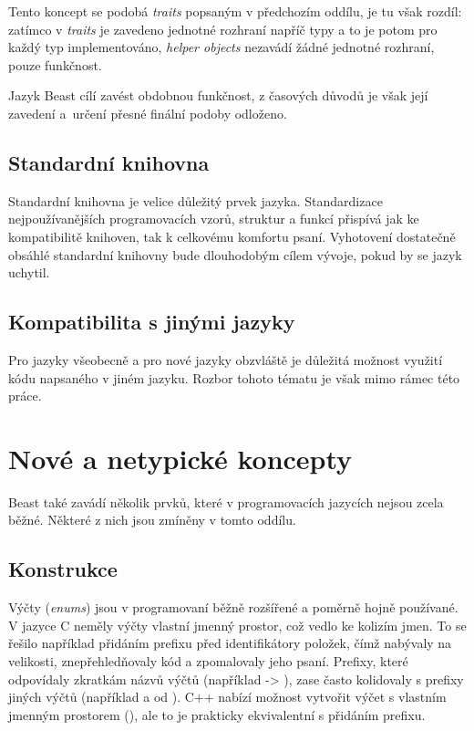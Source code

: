 Tento koncept se podobá \textit{traits} popsaným v předchozím oddílu, je tu však rozdíl: zatímco v \textit{traits} je zavedeno jednotné rozhraní napříč typy a to je potom pro každý typ implementováno, \textit{helper objects} nezavádí žádné jednotné rozhraní, pouze funkčnost.

Jazyk Beast cílí zavést obdobnou funkčnost, z časových důvodů je však její zavedení a~určení přesné finální podoby odloženo.

\subsection{Standardní knihovna}
Standardní knihovna je velice důležitý prvek jazyka. Standardizace nejpoužívanějších programovacích vzorů, struktur a funkcí přispívá jak ke kompatibilitě knihoven, tak k celkovému komfortu psaní. Vyhotovení dostatečně obsáhlé standardní knihovny bude dlouhodobým cílem vývoje, pokud by se jazyk uchytil.

\subsection{Kompatibilita s jinými jazyky}
Pro jazyky všeobecně a pro nové jazyky obzvláště je důležitá možnost využití kódu napsaného v jiném jazyku. Rozbor tohoto tématu je však mimo rámec této práce.

\section{Nové a netypické koncepty}
Beast také zavádí několik prvků, které v programovacích jazycích nejsou zcela běžné. Některé z nich jsou zmíněny v tomto oddílu.

\subsection{Konstrukce } \label{colonIdent}
Výčty (\textit{enums}) jsou v programovaní běžně rozšířené a poměrně hojně používané. V jazyce C neměly výčty vlastní jmenný prostor, což vedlo ke kolizím jmen. To se řešilo například přidáním prefixu před identifikátory položek, čímž nabývaly na velikosti, znepřehledňovaly kód a zpomalovaly jeho psaní. Prefixy, které odpovídaly zkratkám názvů výčtů (například  -> ), zase často kolidovaly s prefixy jiných výčtů (například  a  od ). C++ nabízí možnost vytvořit výčet s vlastním jmenným prostorem (), ale to je prakticky ekvivalentní s přidáním prefixu.

